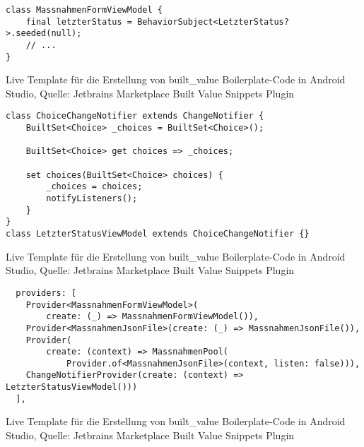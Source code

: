 


\begin{listing}[h]
    \begin{verbatim}
class MassnahmenFormViewModel {
    final letzterStatus = BehaviorSubject<LetzterStatus?>.seeded(null);
    // ...
}
\end{verbatim} 
\caption[built_value Live Template]{Live Template für die Erstellung von built_value Boilerplate-Code in Android Studio, Quelle: Jetbrains Marketplace Built Value Snippets Plugin}
\label{lst:BuiltValueLiveTemplate}
\end{listing}


\begin{listing}[h]
    \begin{verbatim}
class ChoiceChangeNotifier extends ChangeNotifier {
    BuiltSet<Choice> _choices = BuiltSet<Choice>();

    BuiltSet<Choice> get choices => _choices;

    set choices(BuiltSet<Choice> choices) {
        _choices = choices;
        notifyListeners();
    }
}
class LetzterStatusViewModel extends ChoiceChangeNotifier {}
\end{verbatim} 
\caption[built_value Live Template]{Live Template für die Erstellung von built_value Boilerplate-Code in Android Studio, Quelle: Jetbrains Marketplace Built Value Snippets Plugin}
\label{lst:BuiltValueLiveTemplate}
\end{listing}



\begin{listing}[h]
    \begin{verbatim}
  providers: [
    Provider<MassnahmenFormViewModel>(
        create: (_) => MassnahmenFormViewModel()),
    Provider<MassnahmenJsonFile>(create: (_) => MassnahmenJsonFile()),
    Provider(
        create: (context) => MassnahmenPool(
            Provider.of<MassnahmenJsonFile>(context, listen: false))),
    ChangeNotifierProvider(create: (context) => LetzterStatusViewModel()))
  ],
\end{verbatim} 
\caption[built_value Live Template]{Live Template für die Erstellung von built_value Boilerplate-Code in Android Studio, Quelle: Jetbrains Marketplace Built Value Snippets Plugin}
\label{lst:BuiltValueLiveTemplate}
\end{listing}




